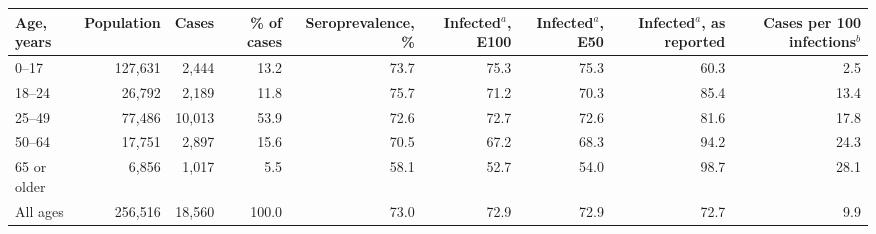\begin{tabular}{lrrrrrrrr}
\toprule
Age, years & Population & Cases & \% of cases & Seroprevalence, \% & Infected$^{a}$, E100 & Infected$^{a}$, E50 & Infected$^{a}$, as reported & Cases per 100 infections$^{b}$ \\
\midrule
0--17 & 127,631 & 2,444 & 13.2 & 73.7 & 75.3 & 75.3 & 60.3 & 2.5 \\
18--24 & 26,792 & 2,189 & 11.8 & 75.7 & 71.2 & 70.3 & 85.4 & 13.4 \\
25--49 & 77,486 & 10,013 & 53.9 & 72.6 & 72.7 & 72.6 & 81.6 & 17.8 \\
50--64 & 17,751 & 2,897 & 15.6 & 70.5 & 67.2 & 68.3 & 94.2 & 24.3 \\
65 or older & 6,856 & 1,017 & 5.5 & 58.1 & 52.7 & 54.0 & 98.7 & 28.1 \\
\addlinespace
All ages & 256,516 & 18,560 & 100.0 & 73.0 & 72.9 & 72.9 & 72.7 & 9.9 \\
\bottomrule
\end{tabular}
